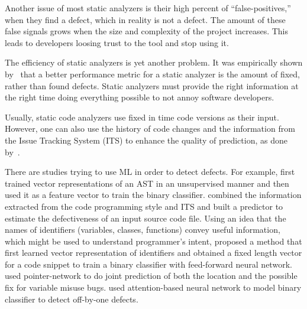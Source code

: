 Another issue of most static analyzers is their high 
percent of ``false-positives,'' when they find a defect, which
in reality is not a defect. The amount of these false signals grows 
when the size and complexity of the project increases. 
This leads to developers loosing trust to the tool and stop
using it. 

The efficiency of static analyzers is yet another problem. It was
empirically shown by~\citet{10.1145/3188720} that 
a better performance metric for a static analyzer 
is the amount of fixed, rather than found defects. 
Static analyzers must provide the right information 
at the right time doing everything possible to not annoy 
software developers. 

Usually, static code analyzers use fixed in time code versions as their
input. However, one can also use the history of code changes and 
the information from the Issue Tracking System (ITS) 
to enhance the quality of prediction, as done by~\citet{Gupta2018IntelligentCR, kapur2018estimating}.

There are studies trying to use ML in order to detect defects. 
For example, \citet{Dam2018ADT} first trained vector representations of 
an AST in an unsupervised manner and then used it as a feature vector 
to train the binary classifier. 
\citet{kapur2018estimating} 
combined the information extracted from the code programming style and ITS 
and built a predictor to estimate the defectiveness of an input source code 
file. Using an idea that the names of identifiers (variables, classes, functions) 
convey useful information, which might be used to understand programmer's 
intent,
\citet{Pradel2018DeepBugsAL} proposed a method that first learned 
vector representation of identifiers 
and obtained a fixed length vector for a code snippet to train a binary classifier 
with feed-forward neural network. 
\citet{vasic2019neural} used pointer-network to do joint prediction of 
both the location and the possible fix for variable misuse bugs. 
\citet{briem2019using} used attention-based neural network  to model binary 
classifier to detect off-by-one defects.
